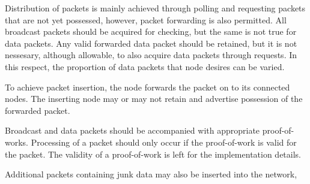 %		
%		
%		
%		
%		

Distribution of packets is mainly achieved through polling and requesting packets that are not yet possessed, however, packet forwarding is also permitted. All broadcast packets should be acquired for checking, but the same is not true for data packets. Any valid forwarded data packet should be retained, but it is not nessesary, although allowable, to also acquire data packets through requests. In this respect, the proportion of data packets that node desires can be varied.

To achieve packet insertion, the node forwards the packet on to its connected nodes. The inserting node may or may not retain and advertise possession of the forwarded packet.

Broadcast and data packets should be accompanied with appropriate proof-of-works. Processing of a packet should only occur if the proof-of-work is valid for the packet. The validity of a proof-of-work is left for the implementation details.

Additional packets containing junk data may also be inserted into the network, 